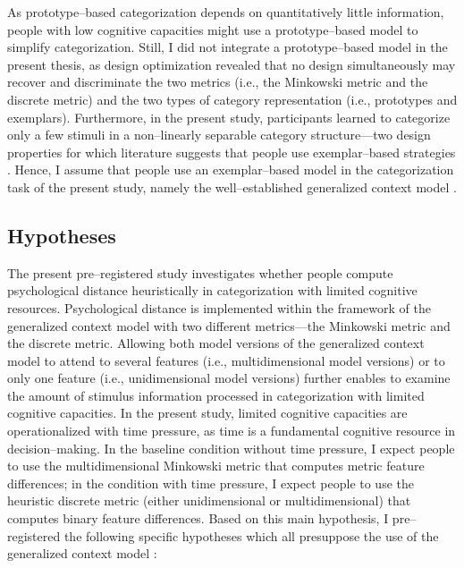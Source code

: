 \documentclass[a4paper,man,natbib]{apa6}
\begin{document}
As prototype--based categorization depends on quantitatively little information, people with low cognitive capacities might use a prototype--based model to simplify categorization. Still, I did not integrate a prototype--based model in the present thesis, as design optimization revealed that no design simultaneously may recover and discriminate the two metrics (i.e., the Minkowski metric and the discrete metric) and the two types of category representation (i.e., prototypes and exemplars). Furthermore, in the present study, participants learned to categorize only a few stimuli in a non--linearly separable category structure---two design properties for which literature suggests that people use exemplar--based strategies \citep{smith1998prototypes, smith2000thirty}. Hence, I assume that people use an exemplar--based model in the categorization task of the present study, namely the well--established generalized context model \citep{nosofsky1986attention}.

\subsection{Hypotheses}
The present pre--registered study investigates whether people compute psychological distance heuristically in categorization with limited cognitive resources. Psychological distance is implemented within the framework of the generalized context model \citep{nosofsky1989further} with two different metrics---the Minkowski metric and the discrete metric. Allowing both model versions of the generalized context model to attend to several features (i.e., multidimensional model versions) or to only one feature (i.e., unidimensional model versions) further enables to examine the amount of stimulus information processed in categorization with limited cognitive capacities. In the present study, limited cognitive capacities are operationalized with time pressure, as time is a fundamental cognitive resource in decision--making. In the baseline condition without time pressure, I expect people to use the multidimensional Minkowski metric that computes metric feature differences; in the condition with time pressure, I expect people to use the heuristic discrete metric (either unidimensional or multidimensional) that computes binary feature differences. Based on this main hypothesis, I pre--registered the following specific hypotheses which all presuppose the use of the generalized context model \citep{nosofsky1989further}: 
\end{document}
